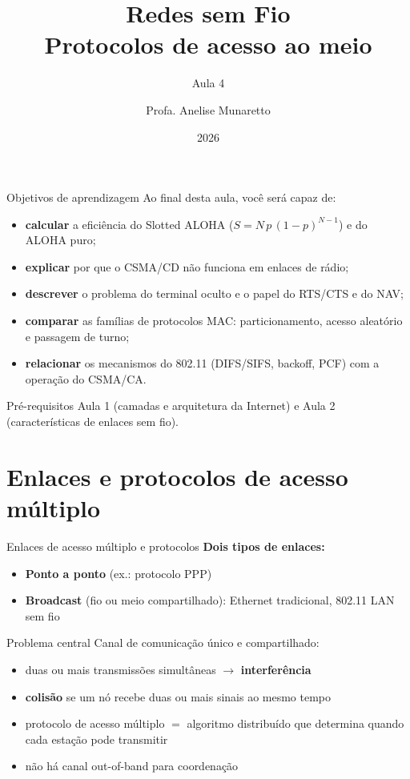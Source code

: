 \documentclass[aspectratio=169,11pt]{beamer}
\title[Redes sem Fio]{Redes sem Fio\\ Protocolos de acesso ao meio}
\subtitle{Aula 4}
\author[Anelise Munaretto]{Profa. Anelise Munaretto}
\institute[Curso]{Redes sem Fio --- Ciência da Computação}
\date{2026}
\begin{document}
\begin{frame}[plain]
  \titlepage
\end{frame}

\begin{frame}{Objetivos de aprendizagem}
  Ao final desta aula, você será capaz de:
  \begin{itemize}
    \item \textbf{calcular} a eficiência do Slotted ALOHA ($S=N\,p\,(1-p)^{N-1}$) e do ALOHA puro;
    \item \textbf{explicar} por que o CSMA/CD não funciona em enlaces de rádio;
    \item \textbf{descrever} o problema do terminal oculto e o papel do RTS/CTS e do NAV;
    \item \textbf{comparar} as famílias de protocolos MAC: particionamento, acesso aleatório e passagem de turno;
    \item \textbf{relacionar} os mecanismos do 802.11 (DIFS/SIFS, backoff, PCF) com a operação do CSMA/CA.
  \end{itemize}
  \begin{alertblock}{Pré-requisitos}
    Aula 1 (camadas e arquitetura da Internet) e Aula 2 (características de enlaces sem fio).
  \end{alertblock}
\end{frame}

\section{Enlaces e protocolos de acesso múltiplo}

\begin{frame}{Enlaces de acesso múltiplo e protocolos}
  \textbf{Dois tipos de enlaces:}
  \begin{itemize}
    \item \textbf{Ponto a ponto} (ex.: protocolo PPP)
    \item \textbf{Broadcast} (fio ou meio compartilhado): Ethernet tradicional, 802.11 LAN sem fio
  \end{itemize}
  \begin{block}{Problema central}
    Canal de comunicação único e compartilhado:
    \begin{itemize}
      \item duas ou mais transmissões simultâneas $\rightarrow$ \textbf{interferência}
      \item \textbf{colisão} se um nó recebe duas ou mais sinais ao mesmo tempo
      \item protocolo de acesso múltiplo $=$ algoritmo distribuído que determina quando cada estação pode transmitir
      \item \alert{não há canal out-of-band para coordenação}
    \end{itemize}
  \end{block}
\end{frame}
\end{document}
